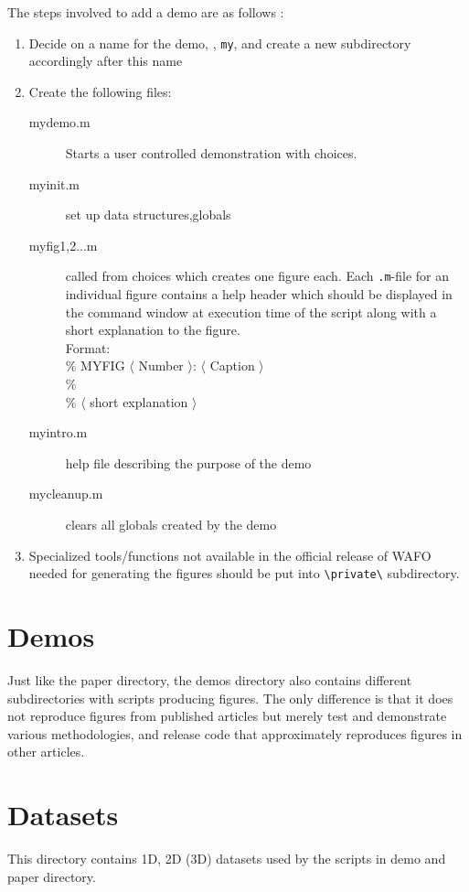\documentclass[10pt,a4paper]{article}   %
\begin{document}
The steps involved to add a demo are as follows :
\begin{enumerate}
\item Decide on a name for the demo, \eg{}, \verb+my+, and create a new subdirectory accordingly after this name
\item Create the following files:
\begin{description}
\item[mydemo.m] Starts a user controlled demonstration with choices. 
\item[myinit.m] set up data structures,globals
\item[myfig1,2...m] called from choices which creates one figure each.
 Each \verb+.m+-file for an individual figure contains a help 
header which should be displayed in the command window at execution time of the script
along with a short explanation to the figure.\\
 Format: \\
\% MYFIG $\langle$ Number $\rangle $:  $\langle$ Caption $\rangle $ \\
\% \\
\% $\langle$ short explanation $\rangle$
\item[myintro.m]help file describing the purpose of the demo
\item[mycleanup.m]clears all globals created by the demo
\end{description}
\item Specialized tools/functions not available in the official 
  release of WAFO needed for generating the figures should be put into 
  \verb+\private\+ subdirectory.
\end{enumerate}

\section{Demos}
Just  like the paper directory, 
the demos directory also contains different subdirectories with scripts producing figures. 
The only difference
is that it does not reproduce figures from published articles but merely test and 
demonstrate various methodologies,
and release code that approximately reproduces figures in other articles.  

\section{Datasets}
This directory contains 1D, 2D (3D) datasets used by the scripts in demo and paper directory.
\end{document}

